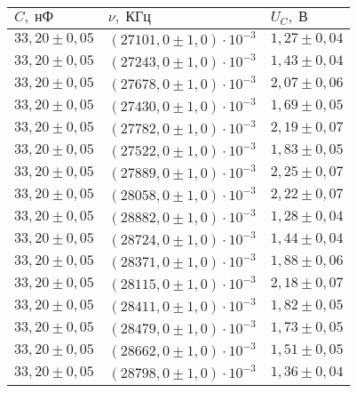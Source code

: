 \begin{tabular}{|l|l|l|}
\hline
$C,\;\text{нФ}$ & $\nu,\;\text{КГц}$ & $U_C,\;\text{В}$\\\hline
$33{,}20 \pm 0{,}05$ & $\left(27101{,}0 \pm 1{,}0\right)\cdot 10^{-3}$ & $1{,}27 \pm 0{,}04$\\\hline
$33{,}20 \pm 0{,}05$ & $\left(27243{,}0 \pm 1{,}0\right)\cdot 10^{-3}$ & $1{,}43 \pm 0{,}04$\\\hline
$33{,}20 \pm 0{,}05$ & $\left(27678{,}0 \pm 1{,}0\right)\cdot 10^{-3}$ & $2{,}07 \pm 0{,}06$\\\hline
$33{,}20 \pm 0{,}05$ & $\left(27430{,}0 \pm 1{,}0\right)\cdot 10^{-3}$ & $1{,}69 \pm 0{,}05$\\\hline
$33{,}20 \pm 0{,}05$ & $\left(27782{,}0 \pm 1{,}0\right)\cdot 10^{-3}$ & $2{,}19 \pm 0{,}07$\\\hline
$33{,}20 \pm 0{,}05$ & $\left(27522{,}0 \pm 1{,}0\right)\cdot 10^{-3}$ & $1{,}83 \pm 0{,}05$\\\hline
$33{,}20 \pm 0{,}05$ & $\left(27889{,}0 \pm 1{,}0\right)\cdot 10^{-3}$ & $2{,}25 \pm 0{,}07$\\\hline
$33{,}20 \pm 0{,}05$ & $\left(28058{,}0 \pm 1{,}0\right)\cdot 10^{-3}$ & $2{,}22 \pm 0{,}07$\\\hline
$33{,}20 \pm 0{,}05$ & $\left(28882{,}0 \pm 1{,}0\right)\cdot 10^{-3}$ & $1{,}28 \pm 0{,}04$\\\hline
$33{,}20 \pm 0{,}05$ & $\left(28724{,}0 \pm 1{,}0\right)\cdot 10^{-3}$ & $1{,}44 \pm 0{,}04$\\\hline
$33{,}20 \pm 0{,}05$ & $\left(28371{,}0 \pm 1{,}0\right)\cdot 10^{-3}$ & $1{,}88 \pm 0{,}06$\\\hline
$33{,}20 \pm 0{,}05$ & $\left(28115{,}0 \pm 1{,}0\right)\cdot 10^{-3}$ & $2{,}18 \pm 0{,}07$\\\hline
$33{,}20 \pm 0{,}05$ & $\left(28411{,}0 \pm 1{,}0\right)\cdot 10^{-3}$ & $1{,}82 \pm 0{,}05$\\\hline
$33{,}20 \pm 0{,}05$ & $\left(28479{,}0 \pm 1{,}0\right)\cdot 10^{-3}$ & $1{,}73 \pm 0{,}05$\\\hline
$33{,}20 \pm 0{,}05$ & $\left(28662{,}0 \pm 1{,}0\right)\cdot 10^{-3}$ & $1{,}51 \pm 0{,}05$\\\hline
$33{,}20 \pm 0{,}05$ & $\left(28798{,}0 \pm 1{,}0\right)\cdot 10^{-3}$ & $1{,}36 \pm 0{,}04$\\\hline
\end{tabular}
